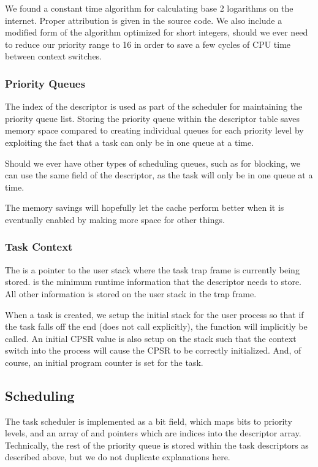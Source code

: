 \documentclass[pdftex,10pt,a4paper]{article}
\begin{document}
We found a constant time algorithm for calculating base 2 logarithms
on the internet. Proper attribution is given in the source code. We
also include a modified form of the algorithm optimized for short
integers, should we ever need to reduce our priority range to 16 in
order to save a few cycles of CPU time between context switches.

\subsubsection*{Priority Queues}

The  index of the descriptor is used as part of the
scheduler for maintaining the priority queue list. Storing the
priority queue within the descriptor table saves memory space
compared to creating individual queues for each priority level by
exploiting the fact that a task can only be in one queue at a time.

Should we ever have other types of scheduling queues, such as for
blocking, we can use the same  field of the descriptor, as
the task will only be in one queue at a time.

The memory savings will hopefully let the cache perform better when it
is eventually enabled by making more space for other things.

\subsubsection*{Task Context}

The  is a pointer to the user stack where the task trap frame
is currently being stored.  is the minimum runtime
information that the descriptor needs to store. All other information
is stored on the user stack in the trap frame.

When a task is created, we setup the initial stack for the user
process so that if the task falls off the end (does not call 
explicitly), the  function will implicitly be called. An
initial CPSR value is also setup on the stack such that the context
switch into the process will cause the CPSR to be correctly
initialized. And, of course, an initial program counter is set for the
task.

\subsection*{Scheduling}

The task scheduler is implemented as a bit field, which maps bits to
priority levels, and an array of  and  pointers
which are indices into the descriptor array. Technically, the rest of
the priority queue is stored within the task descriptors as described
above, but we do not duplicate explanations here.
\end{document}
